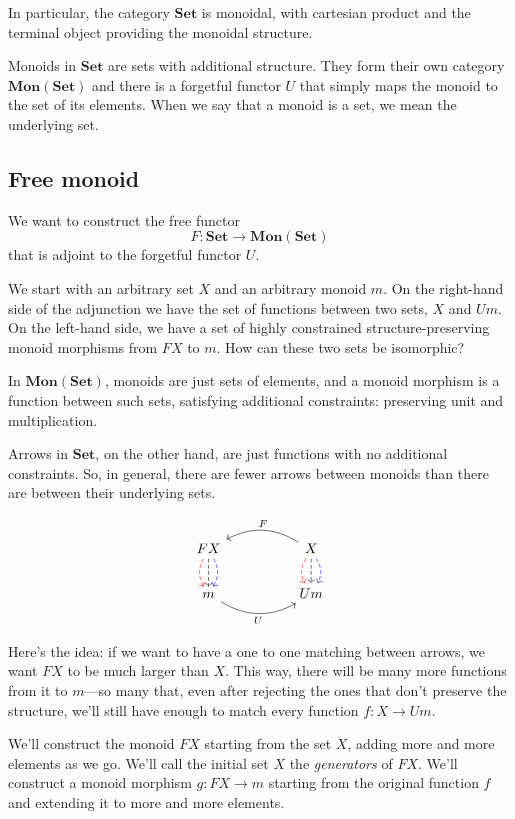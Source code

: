 \documentclass[DaoFP]{subfiles}
\begin{document}
In particular, the category $\mathbf{Set}$ is monoidal, with cartesian product and the terminal object providing the monoidal structure. 

Monoids in $\mathbf{Set}$ are sets with additional structure. They form their own category $\mathbf{Mon}(\mathbf{Set})$ and there is a forgetful functor $U$ that simply maps the monoid to the set of its elements. When we say that a monoid is a set, we mean the underlying set.

\subsection{Free monoid}

We want to construct the free functor 
\[ F \colon \mathbf{Set} \to \mathbf{Mon}(\mathbf{Set})\]
that is adjoint to the forgetful functor $U$. 

We start with an arbitrary set $X$ and an arbitrary monoid $m$. On the right-hand side of the adjunction we have the set of functions between two sets, $X$ and $U m$. On the left-hand side, we have a set of highly constrained structure-preserving monoid morphisms from $F X$ to $m$. How can these two sets be isomorphic?

In  $\mathbf{Mon}(\mathbf{Set})$, monoids are just sets of elements, and a monoid morphism is a function between such sets, satisfying additional constraints: preserving unit and multiplication. 

Arrows in $\mathbf{Set}$, on the other hand, are just functions with no additional constraints. So, in general, there are fewer arrows between monoids than there are between their underlying sets. 

\[
 \begin{tikzcd}
F X
\arrow[d, bend right, red, dashed]
\arrow[d, dashed]
\arrow[d, bend left, blue, dashed]
  &&
X
\arrow[d, bend right, red, dashed]
\arrow[d, dashed]
\arrow[d, bend left, blue, dashed]
 \arrow[ll, bend right, "F"']
 \\
m
   \arrow[rr, bend right, "U"']
 &&
 U m
  \end{tikzcd}
\]

Here's the idea: if we want to have a one to one matching between arrows, we want $F X$ to be much larger than $X$. This way, there will be many more functions from it to $m$---so many that, even after rejecting the ones that don't preserve the structure, we'll still have enough to match every function $f \colon X \to U m$.

We'll construct the monoid $F X$ starting from the set $X$, adding more and more elements as we go. We'll call the initial set $X$ the \emph{generators} of $F X$. We'll construct a monoid morphism $g \colon F X \to m$ starting from the original function $f$ and extending it to more and more elements.
\end{document}
